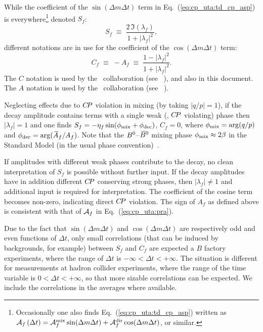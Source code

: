 While the coefficient of the $\sin(\Delta m \Delta t)$ term in 
Eq.~(\ref{eq:cp_uta:td_cp_asp}) is everywhere\footnote
{
  Occasionally one also finds Eq.~(\ref{eq:cp_uta:td_cp_asp}) written as
  ${\cal A}_{f} \left(\Delta t\right) = 
  {\cal A}^{\rm mix}_f \sin(\Delta m \Delta t) + {\cal A}^{\rm dir}_f \cos(\Delta m \Delta t)$,
  or similar.
} denoted $S_f$:
\begin{equation}
  \label{eq:cp_uta:s_def}
  S_f \;\equiv\; \frac{2\, \Im(\lambda_f)}{1 + \left|\lambda_f\right|^2},
\end{equation}
different notations are in use for the
coefficient of the $\cos(\Delta m \Delta t)$ term:
\begin{equation}
  \label{eq:cp_uta:c_def}
  C_f \;\equiv\; - A_f \;\equiv\; \frac{1 - \left|\lambda_f\right|^2}{1 + \left|\lambda_f\right|^2}.
\end{equation}
The $C$ notation is used by the \babar\  collaboration 
(see \eg~\cite{Aubert:2001sp}), 
and also in this document.
The $A$ notation is used by the \belle\ collaboration
(see \eg~\cite{Abe:2001xe}).

Neglecting effects due to $C\!P$ violation in mixing 
(by taking $|q/p| = 1$),
if the decay amplitude contains terms with 
a single weak (\ie, $C\!P$ violating) phase
then $\left|\lambda_f\right| = 1$ and one finds
$S_f = -{\eta_f} \sin(\phi_{\rm mix} + \phi_{\rm dec})$, $C_f = 0$,
where $\phi_{\rm mix}=\arg(q/p)$ and $\phi_{\rm dec}=\arg(\kern 0.18em\overline{\kern -0.18em A}{}_f/A_f)$.
Note that the $B^0$--$\kern 0.18em\overline{\kern -0.18em B}{}^0$ mixing phase $\phi_{\rm mix}\approx2\beta$
in the Standard Model (in the usual phase convention)~\cite{Carter:1980tk,Bigi:1981qs}. 

If amplitudes with different weak phases contribute to the decay, 
no clean interpretation of $S_f$ is possible without further input. 
If the decay amplitudes have in addition different $C\!P$ conserving strong phases, then $\left| \lambda_f \right| \neq 1$ and additional input is required for interpretation.
The coefficient of the cosine term becomes non-zero,
indicating direct $C\!P$ violation.
The sign of $A_f$ as defined above is consistent with that of ${\cal A}_{f}$ in 
Eq.~(\ref{eq:cp_uta:pra}).

Due to the fact that $\sin(\Delta m \Delta t)$ and $\cos(\Delta m \Delta t)$ are respectively odd and even functions of $\Delta t$, only small correlations (that can be induced by backgrounds, for example) between $S_f$ and $C_f$ are expected a $B$ factory experiments, where the range of $\Delta t$ is $-\infty < \Delta t < +\infty$.
The situation is different for measurements at hadron collider experiments, where the range of the time variable is $0 < \Delta t < +\infty$, so that more sizable correlations can be expected.  
We include the correlations in the averages where available.

